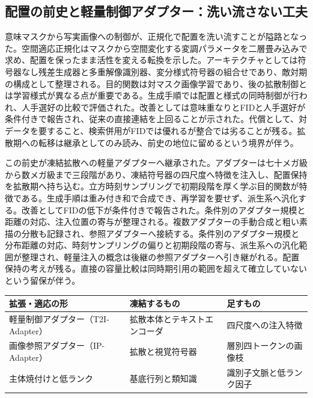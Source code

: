 \documentclass[lualatex,a4paper,10pt]{jlreq}
\begin{document}
\subsection{配置の前史と軽量制御アダプター：洗い流さない工夫}
意味マスクから写実画像への制御が、正規化で配置を洗い流すことが隘路となった。空間適応正規化はマスクから空間変化する変調パラメータを二層畳み込みで求め、配置を保ったまま活性を変える転換を示した\autocite{btd041}。アーキテクチャとしては符号器なし残差生成器と多重解像識別器、変分様式符号器の組合せであり、敵対期の構成として整理される\autocite{btd041}。目的関数は対マスク画像学習であり、後の拡散制御とは学習様式が異なる点が重要である。生成手順では配置と様式の同時制御が行われ、人手選好の比較で評価された\autocite{btd041}。改善としては意味重なりとFIDと人手選好が条件付きで報告され、従来の直接連結を上回ることが示された\autocite{btd041}。代償として、対データを要すること、検索併用がFIDでは優れるが整合では劣ることが残る。拡散期への転移は継承としてのみ読み、前史の地位に留めるという境界が伴う。

この前史が凍結拡散への軽量アダプターへ継承された。アダプターは七十メガ級から数メガ級まで三段階があり、凍結符号器の四尺度へ特徴を注入し、配置保持を拡散期へ持ち込む\autocite{btd037}。立方時刻サンプリングで初期段階を厚く学ぶ目的関数が特徴である\autocite{btd037}。生成手順は重み付き和で合成でき、再学習を要せず、派生系へ汎化する\autocite{btd037}。改善としてFIDの低下が条件付きで報告された。条件別のアダプター規模と距離の対応、注入位置の寄与が整理される。複数アダプターの手動合成と粗い素描の分散も記録され、参照アダプターへ接続する。条件別のアダプター規模と分布距離の対応、時刻サンプリングの偏りと初期段階の寄与、派生系への汎化範囲が整理され、軽量注入の概念は後継の参照アダプターへ引き継がれる\autocite{btd037}。配置保持の考えが残る。直接の容量比較は同時期引用の範囲を超えて確立していないという留保が伴う。

\begin{center}
\small
\begin{tabularx}{\textwidth}{@{}p{}p{}X@{}}
\toprule
拡張・適応の形 & 凍結するもの & 足すもの \\
\midrule
軽量制御アダプター（T2I-Adapter） & 拡散本体とテキストエンコーダ & 四尺度への注入特徴 \\
画像参照アダプター（IP-Adapter） & 拡散と視覚符号器 & 層別四トークンの画像枝 \\
主体焼付けと低ランク & 基底行列と類知識 & 識別子文脈と低ランク因子 \\
\bottomrule
\end{tabularx}
\end{center}
\end{document}
